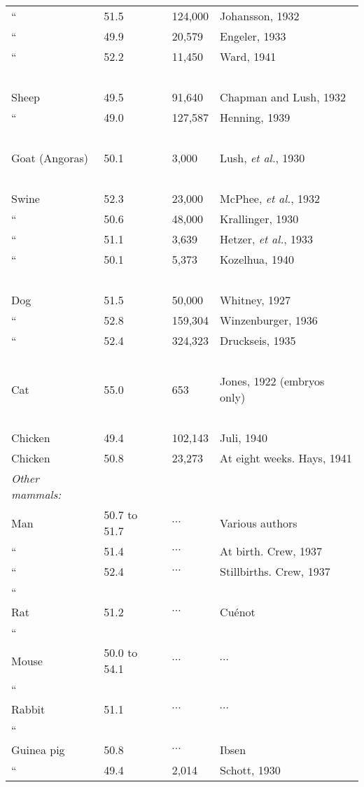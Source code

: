 {\begin{longtable}{L{3cm}|C{2.5cm}|C{2.5cm}|L{3.5cm}}
		``						& 51.5			& 124,000		& Johansson, 1932			\\
		``						& 49.9			& 20,579		& Engeler, 1933				\\
		``						& 52.2			& 11,450		& Ward, 1941				\\
		~						&				&				& 							\\
		Sheep					& 49.5			& 91,640		& Chapman and Lush, 1932	\\
		``						& 49.0			& 127,587		& Henning, 1939				\\
		~						&				&				& 							\\
		Goat (Angoras)			& 50.1			& 3,000			& Lush, \textit{et al.}, 1930 \\
		~						&				&				& 							\\
		Swine					& 52.3			& 23,000		& McPhee, \textit{et al.}, 1932 \\
		``						& 50.6			& 48,000		& Krallinger, 1930			\\
		``						& 51.1			& 3,639			& Hetzer, \textit{et al.}, 1933 \\
		``						& 50.1			& 5,373			& Kozelhua, 1940 			\\
		~						&				&				& 							\\
		Dog						& 51.5			& 50,000		& Whitney, 1927				\\
		``						& 52.8			& 159,304		& Winzenburger, 1936		\\
		``						& 52.4			& 324,323		& Druckseis, 1935			\\
		~						&				&				& 							\\
		Cat						& 55.0			& 653			& Jones, 1922 (embryos only) \\
		~						&				&				& 							\\
		Chicken					& 49.4			& 102,143		& Juli, 1940				\\
		\hline
		Chicken					& 50.8			& 23,273		& At eight weeks. Hays, 1941 \\
		\hline
		\textit{Other mammals:}	&				&				& 							\\
		Man 					& 50.7 to 51.7	& $\cdots$		& Various authors			\\
		``						& 51.4			& $\cdots$		& At birth. Crew, 1937		\\
		``						& 52.4			& $\cdots$		& Stillbirths. Crew, 1937	\\
		``						&				&				& 							\\
		Rat						& 51.2			& $\cdots$		& Cu\'{e}not				\\
		``						&				&				& 							\\
		Mouse					& 50.0 to 54.1	& $\cdots$		& $\cdots$					\\
		``						&				&				& 							\\
		Rabbit					& 51.1			& $\cdots$		& $\cdots$					\\
		``						&				&				& 							\\
		Guinea pig				& 50.8			& $\cdots$		& Ibsen						\\
		``						& 49.4			& 2,014			& Schott, 1930				\\
		\hline
	\end{longtable}
}

